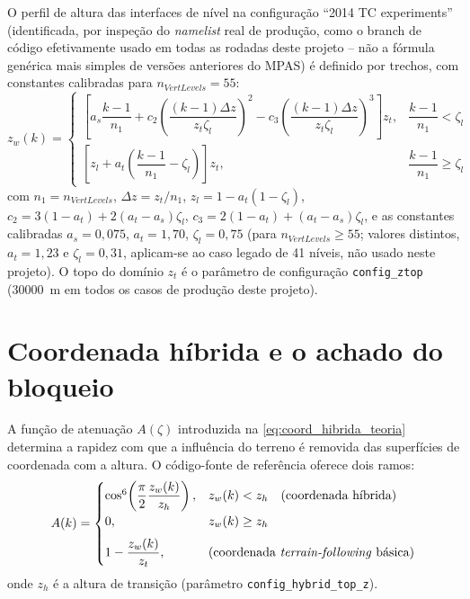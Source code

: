 O perfil de altura das interfaces de nível na configuração
``2014 TC experiments'' (identificada, por inspeção do \textit{namelist}
real de produção, como o branch de código efetivamente usado em todas as
rodadas deste projeto -- não a fórmula genérica mais simples de versões
anteriores do MPAS) é definido por trechos, com constantes calibradas
para $n_{VertLevels}=55$:
\begin{equation}
  z_w(k) =
  \begin{cases}
    \left[ a_s \dfrac{k-1}{n_1} + c_2\left(\dfrac{(k-1)\Delta z}{z_t \zeta_l}\right)^{\!2} - c_3\left(\dfrac{(k-1)\Delta z}{z_t \zeta_l}\right)^{\!3} \right] z_t, & \dfrac{k-1}{n_1} < \zeta_l \\[1.2em]
    \left[ z_l + a_t\left(\dfrac{k-1}{n_1} - \zeta_l\right) \right] z_t, & \dfrac{k-1}{n_1} \ge \zeta_l
  \end{cases}
  \label{eq:zw}
\end{equation}
com $n_1 = n_{VertLevels}$, $\Delta z = z_t/n_1$, $z_l = 1 - a_t(1-\zeta_l)$,
$c_2 = 3(1-a_t) + 2(a_t-a_s)\zeta_l$, $c_3 = 2(1-a_t) + (a_t-a_s)\zeta_l$,
e as constantes calibradas $a_s = 0{,}075$, $a_t = 1{,}70$,
$\zeta_l = 0{,}75$ (para $n_{VertLevels} \ge 55$; valores distintos,
$a_t=1{,}23$ e $\zeta_l=0{,}31$, aplicam-se ao caso legado de 41 níveis,
não usado neste projeto). O topo do domínio $z_t$ é o parâmetro de
configuração \texttt{config\_ztop} (\SI{30000}{\metre} em todos os casos
de produção deste projeto).

\section{Coordenada híbrida e o achado do bloqueio}
\label{sec:ah_hibrido}

A função de atenuação $A(\zeta)$ introduzida na
\cref{eq:coord_hibrida_teoria} determina a rapidez com que a influência
do terreno é removida das superfícies de coordenada com a altura. O
código-fonte de referência oferece dois ramos:
\begin{equation}
  A(k) =
  \begin{cases}
    \cos^6\!\left( \dfrac{\pi}{2} \dfrac{z_w(k)}{z_h} \right), & z_w(k) < z_h \quad \text{(coordenada híbrida)} \\[0.6em]
    0, & z_w(k) \ge z_h \\[0.6em]
    1 - \dfrac{z_w(k)}{z_t}, & \text{(coordenada \textit{terrain-following} básica)}
  \end{cases}
  \label{eq:ah}
\end{equation}
onde $z_h$ é a altura de transição (parâmetro \texttt{config\_hybrid\_top\_z}).

